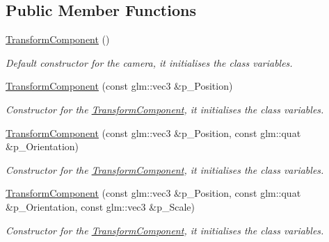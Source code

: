 \subsection*{Public Member Functions}
\begin{DoxyCompactItemize}
\item 
\mbox{\label{class_transform_component_ace1cf2d7d2a7468e9cb3eb0ce382f446}} 
\mbox{\hyperlink{class_transform_component_ace1cf2d7d2a7468e9cb3eb0ce382f446}{Transform\+Component}} ()
\begin{DoxyCompactList}\small\item\em Default constructor for the camera, it initialises the class\textquotesingle{} variables. \end{DoxyCompactList}\item 
\mbox{\hyperlink{class_transform_component_afc7699834c48ec6c5e222d8b09ec3eb4}{Transform\+Component}} (const glm\+::vec3 \&p\+\_\+\+Position)
\begin{DoxyCompactList}\small\item\em Constructor for the \mbox{\hyperlink{class_transform_component}{Transform\+Component}}, it initialises the class\textquotesingle{} variables. \end{DoxyCompactList}\item 
\mbox{\hyperlink{class_transform_component_a86691630518539b29654c71af3e5b50a}{Transform\+Component}} (const glm\+::vec3 \&p\+\_\+\+Position, const glm\+::quat \&p\+\_\+\+Orientation)
\begin{DoxyCompactList}\small\item\em Constructor for the \mbox{\hyperlink{class_transform_component}{Transform\+Component}}, it initialises the class\textquotesingle{} variables. \end{DoxyCompactList}\item 
\mbox{\hyperlink{class_transform_component_af1942a21096683eadb069183d7b7470c}{Transform\+Component}} (const glm\+::vec3 \&p\+\_\+\+Position, const glm\+::quat \&p\+\_\+\+Orientation, const glm\+::vec3 \&p\+\_\+\+Scale)
\begin{DoxyCompactList}\small\item\em Constructor for the \mbox{\hyperlink{class_transform_component}{Transform\+Component}}, it initialises the class\textquotesingle{} variables. \end{DoxyCompactList}\item 
\mbox{\label{class_transform_component_a5b87b5a6fad643d61fb7c56f6886f9b0}} 

\end{DoxyCompactItemize}
